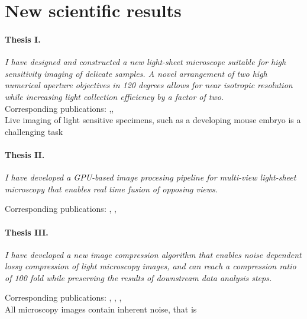 \section{New scientific results}

\paragraph{Thesis I.}\textit{I have designed and constructed a new light-sheet microscope suitable for high sensitivity imaging of delicate samples. A novel  arrangement of two high numerical aperture objectives in 120 degrees allows for near isotropic resolution while increasing light collection efficiency by a factor of two.}\\[0.5ex]
Corresponding publications: \cite{de_medeiros_light-sheet_2016},\cite{strnad_inverted_2016}, \cite{hoyer_breaking_2016}\\[0.5ex]
Live imaging of light sensitive specimens, such as a developing mouse embryo is a challenging task

\paragraph{Thesis II.} \textit{I have developed a GPU-based image procesing pipeline for multi-view light-sheet microscopy that enables real time fusion of opposing views.}

Corresponding publications: \cite{balazs_gpu-based_2016}, \cite{balazs_gpu-based_2016-1}, \cite{balazs_gpu-based_2017}



\paragraph{Thesis III.} \textit{I have  developed a new image compression algorithm that enables noise dependent lossy compression of light microscopy images, and can reach a compression ratio of 100 fold while preserving the results of downstream data analysis steps.}

Corresponding publications: \cite{balazs_real-time_2017}, \cite{balazs_gpu-based_2016}, \cite{balazs_gpu-based_2016-1}, \cite{balazs_gpu-based_2017}\\[1ex]
\indent
All microscopy images contain inherent noise, that is 


